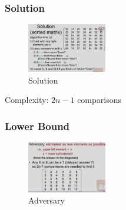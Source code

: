 \subsubsection{Solution}
\begin{figure}[H]
    \centering
    \includegraphics[width=0.309\textwidth]{pic/DAA4/Solution}
    \caption{Solution}
\end{figure}
Complexity: $2n-1$ comparisons

\subsubsection{Lower Bound}
\begin{figure}[H]
    \centering
    \includegraphics[width=0.309\textwidth]{pic/DAA4/Adversary}
    \caption{Adversary}
\end{figure}


